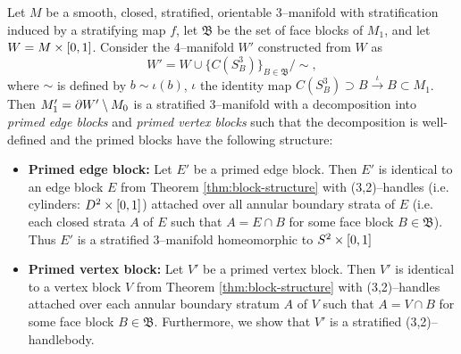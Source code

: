 \begin{theorem}
	\label{thm:primed-block-structure}
	Let $M$ be a smooth, closed, stratified, orientable 3--manifold with stratification induced by a stratifying map $f$, let $\mathfrak{B}$ be the set of face blocks of $M_1$, and let $W=M\times[0,1]$.
	Consider the 4--manifold $W'$ constructed from $W$ as
	\[
		W' = W\cup\{C(S_B^3)\}_{B\in \mathfrak{B}} / \sim,
	\]
	where $\sim$ is defined by $b\sim \iota(b)$, $\iota$ the identity map $C(S_B^3)\supset B\overset{\iota}{\to} B\subset M_1$.
	Then $M_1'=\partial W'\setminus M_0$ is a stratified 3--manifold with a decomposition into \emph{primed edge blocks} and \emph{primed vertex blocks} such that the decomposition is well-defined and the primed blocks have the following structure:
	{\renewcommand\labelitemi{}
		\begin{itemize}
			\item \textbf{Primed edge block:}
			Let $E'$ be a primed edge block.
			Then $E'$ is identical to an edge block $E$ from Theorem \ref{thm:block-structure} with (3,2)--handles (i.e. cylinders: $D^2\times[0,1]$) attached over all annular boundary strata of $E$ (i.e. each closed strata $A$ of $E$ such that $A=E\cap B$ for some face block $B\in\mathfrak{B}$).
			Thus $E'$ is a stratified 3--manifold homeomorphic to $S^2\times[0,1]$
			
			\item \textbf{Primed vertex block:}
			Let $V'$ be a primed vertex block.
			Then $V'$ is identical to a vertex block $V$ from Theorem \ref{thm:block-structure} with (3,2)--handles attached over each annular boundary stratum $A$ of $V$ such that $A=V\cap B$ for some face block $B\in\mathfrak{B}$.
			Furthermore, we show that $V'$ is a stratified (3,2)--handlebody.
		\end{itemize}
	}
\end{theorem}


